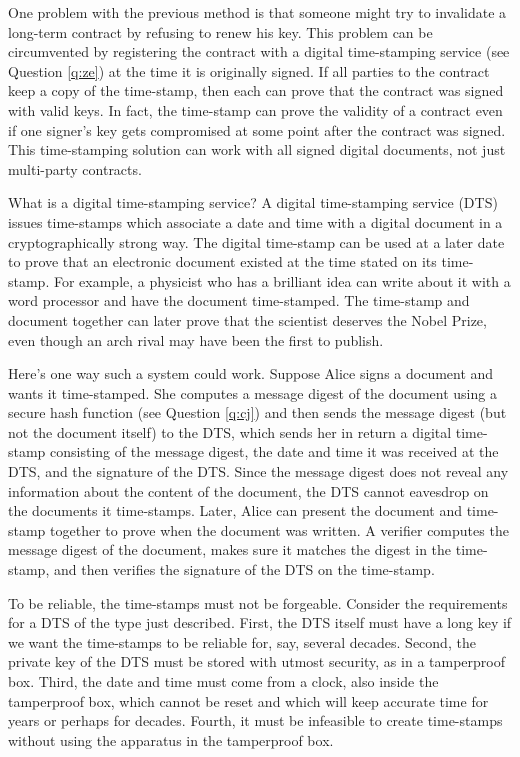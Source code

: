 One problem with the previous method is that someone might try to 
invalidate a long-term contract by refusing to renew his key. This 
problem can be circumvented by registering the contract with a digital 
time-stamping service (see Question \ref{q:ze}) at the time it is 
originally signed. If all parties to the contract keep a copy of the
time-stamp, then each can prove that the contract was signed with
valid keys. In fact, the time-stamp can prove the validity of a
contract even if one signer's key gets compromised at some point
after the contract was signed. This time-stamping solution can work
with all signed digital documents, not just multi-party contracts.

{What is a digital time-stamping service?}
A digital time-stamping service (DTS) issues time-stamps which associate 
a date and time with a digital document in a cryptographically strong way. 
The digital time-stamp can be used at a later date to prove that an 
electronic document existed at the time stated on its time-stamp. For 
example, a physicist who has a brilliant idea can write about it with
a word processor and have the document time-stamped. The time-stamp and
document together can later prove that the scientist deserves the Nobel 
Prize, even though an arch rival may have been the first to publish.

Here's one way such a system could work. Suppose Alice signs a document 
and wants it time-stamped. She computes a message digest of the document 
using a secure hash function (see Question \ref{q:cj}) and then sends the 
message digest (but not the document itself) to the DTS, which sends her in 
return a digital time-stamp consisting of the message digest, the date and 
time it was received at the DTS, and the signature of the DTS. Since the 
message digest does not reveal any information about the content of the 
document, the DTS cannot eavesdrop on the documents it time-stamps. Later, 
Alice can present the document and time-stamp together to prove when the
document was written. A verifier computes the message digest of the document, 
makes sure it matches the digest in the time-stamp, and then verifies the 
signature of the DTS on the time-stamp.

To be reliable, the time-stamps must not be forgeable. Consider the
requirements for a DTS of the type just described. First, the DTS itself 
must have a long key if we want the time-stamps to be reliable for, say,
several decades. Second, the private key of the DTS must be stored with 
utmost security, as in a tamperproof box. Third, the date and time must 
come from a clock, also inside the tamperproof box, which cannot be reset 
and which will keep accurate time for years or perhaps for decades. Fourth, 
it must be infeasible to create time-stamps without using the apparatus 
in the tamperproof box.

